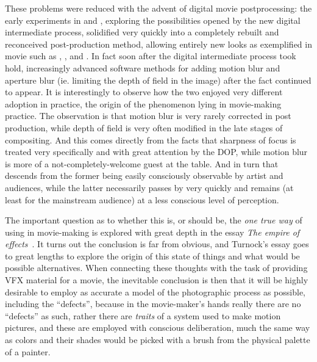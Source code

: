 These problems were reduced with the advent of digital movie postprocessing:
the early experiments in \cite{pleasantville98} and \cite{whatdreams98}, exploring the possibilities
opened by the new \gls{digital intermediate} process, solidified very quickly into a completely rebuilt
and reconceived post-production method, allowing entirely new looks as exemplified in movie such as
\cite{matrix99}, \cite{brother2000}, \cite{amelie2001} and \cite{moulin2001}. 
In fact soon after the digital intermediate process
took hold, increasingly advanced software methods for adding motion blur and aperture blur 
(ie. limiting the depth of field in the image) after the fact continued to appear.
It is interestingly to observe how the two enjoyed very different adoption in practice, the origin
of the phenomenon lying in movie-making practice. The observation is that motion blur is very
rarely corrected in post production, while depth of field is very often modified in the late
stages of compositing. And this comes directly from the facts that sharpness of focus is treated 
very specifically and with great attention by the \gls{DOP}, while  motion blur is more of a 
not-completely-welcome guest at the table. And in turn that descends from the former being
easily consciously observable by artist and audiences, while the latter necessarily 
passes by very quickly and remains (at least for the mainstream audience) at a less conscious
level of perception.


The important question as to whether this is, or should be, the \emph{one true way} of using  in 
movie-making is explored with great depth in the essay \emph{The empire of effects}~\cite{turnock22}. 
It turns out the conclusion is far from obvious, and Turnock's essay goes to great lengths to explore the
origin of this state of things and what would be possible alternatives.
When connecting these thoughts with the task of providing \gls{VFX} material for a movie,
the inevitable conclusion is then that it will be highly desirable to employ as accurate a model of the 
photographic process as possible, including the ``defects'', because in the movie-maker's hands really there
are no ``defects'' as such, rather there are \emph{traits} of a system used to make motion pictures,
and these are employed with conscious deliberation, much the same way as colors and their shades 
would be picked with a brush from the physical palette of a painter.




